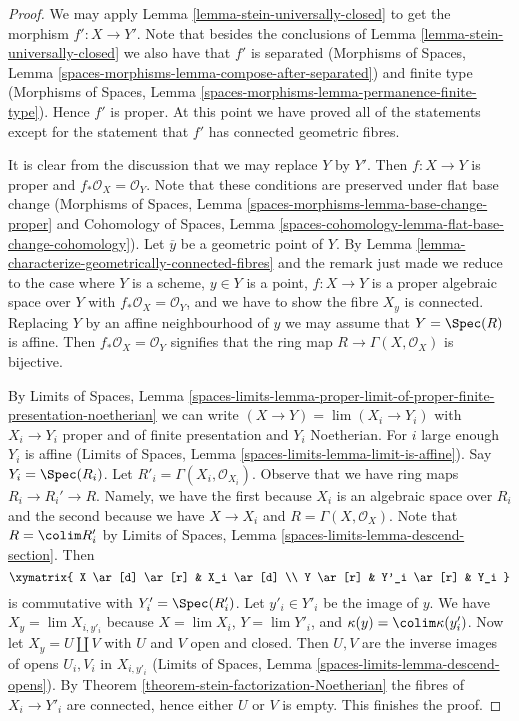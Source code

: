 \begin{proof}
We may apply Lemma \ref{lemma-stein-universally-closed} to get the
morphism $f' : X \to Y'$.
Note that besides the
conclusions of Lemma \ref{lemma-stein-universally-closed} we
also have that $f'$ is separated
(Morphisms of Spaces, Lemma
\ref{spaces-morphisms-lemma-compose-after-separated})
and finite type
(Morphisms of Spaces, Lemma
\ref{spaces-morphisms-lemma-permanence-finite-type}).
Hence $f'$ is proper. At this point we have proved all of the
statements except for the statement
that $f'$ has connected geometric fibres.

\medskip\noindent
It is clear from the discussion that we may replace $Y$ by $Y'$. 
Then $f : X \to Y$ is proper and $f_*\mathcal{O}_X = \mathcal{O}_Y$.
Note that these conditions are preserved under flat base change
(Morphisms of Spaces, Lemma \ref{spaces-morphisms-lemma-base-change-proper}
and
Cohomology of Spaces, Lemma
\ref{spaces-cohomology-lemma-flat-base-change-cohomology}).
Let $\overline{y}$ be a geometric point of $Y$. By
Lemma \ref{lemma-characterize-geometrically-connected-fibres}
and the remark just made we reduce to the case where $Y$ is a
scheme, $y \in Y$ is a point, $f : X \to Y$ is a proper algebraic
space over $Y$ with $f_*\mathcal{O}_X = \mathcal{O}_Y$,
and we have to show the fibre $X_y$ is connected.
Replacing $Y$ by an affine neighbourhood of $y$ we may
assume that $Y = \Spec(R)$ is affine. Then $f_*\mathcal{O}_X = \mathcal{O}_Y$
signifies that the ring map
$R \to \Gamma(X, \mathcal{O}_X)$ is bijective.

\medskip\noindent
By Limits of Spaces, Lemma
\ref{spaces-limits-lemma-proper-limit-of-proper-finite-presentation-noetherian}
we can write $(X \to Y) = \lim (X_i \to Y_i)$ with $X_i \to Y_i$
proper and of finite presentation and $Y_i$ Noetherian. For $i$ large
enough $Y_i$ is affine (Limits of Spaces, Lemma
\ref{spaces-limits-lemma-limit-is-affine}).
Say $Y_i = \Spec(R_i)$. Let $R'_i = \Gamma(X_i, \mathcal{O}_{X_i})$.
Observe that we have ring maps $R_i \to R_i' \to R$. Namely, we have
the first because $X_i$ is an algebraic space over $R_i$ and the second because
we have $X \to X_i$ and $R = \Gamma(X, \mathcal{O}_X)$. Note that
$R = \colim R'_i$ by Limits of Spaces, Lemma
\ref{spaces-limits-lemma-descend-section}.
Then 
$$
\xymatrix{
X \ar[d]  \ar[r] & X_i \ar[d] \\
Y \ar[r] & Y'_i \ar[r] & Y_i
}
$$
is commutative with $Y'_i = \Spec(R'_i)$.
Let $y'_i \in Y'_i$ be the image of $y$.
We have $X_y = \lim X_{i, y'_i}$ because $X = \lim X_i$,
$Y = \lim Y'_i$, and $\kappa(y) = \colim \kappa(y'_i)$.
Now let $X_y = U \amalg V$ with $U$ and $V$ open and closed.
Then $U, V$ are the inverse images of opens $U_i, V_i$ in $X_{i, y'_i}$
(Limits of Spaces, Lemma \ref{spaces-limits-lemma-descend-opens}).
By Theorem \ref{theorem-stein-factorization-Noetherian} the fibres
of $X_i \to Y'_i$ are connected, hence either $U$ or $V$ is empty.
This finishes the proof.
\end{proof}


